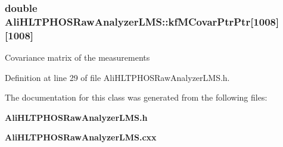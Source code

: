 \subsubsection{\setlength{\rightskip}{0pt plus 5cm}double {\bf Ali\-HLTPHOSRaw\-Analyzer\-LMS::kf\-MCovar\-Ptr\-Ptr}[1008][1008]\hspace{0.3cm}{\tt  [private]}}\label{classAliHLTPHOSRawAnalyzerLMS_AliHLTPHOSRawAnalyzerLMSr0}


Covariance matrix of the measurements 

Definition at line 29 of file Ali\-HLTPHOSRaw\-Analyzer\-LMS.h.

The documentation for this class was generated from the following files:\begin{CompactItemize}
\item 
{\bf Ali\-HLTPHOSRaw\-Analyzer\-LMS.h}\item 
{\bf Ali\-HLTPHOSRaw\-Analyzer\-LMS.cxx}\end{CompactItemize}

